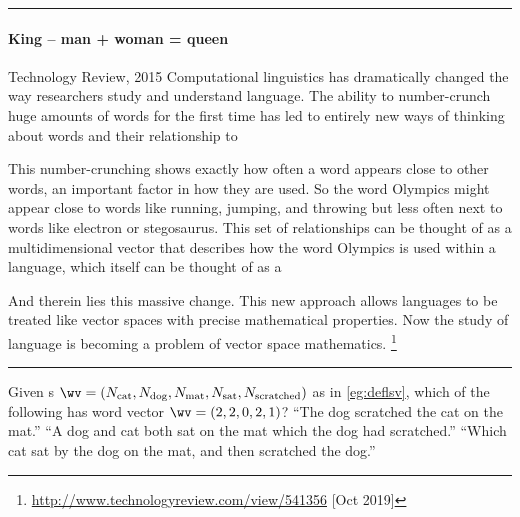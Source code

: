 \begin{table}
\hrule
\begin{minipage}{\linewidth}
\paragraph{King -- man + woman = queen}
\begin{quoted}{Technology Review, 2015}
Computational linguistics has dramatically changed the way researchers study and understand language. 
The ability to number-crunch huge amounts of words for the first time has led to entirely new ways of thinking about words and their relationship to 

This number-crunching shows exactly how often a word appears close to other words, an important factor in how they are used. 
So the word Olympics might appear close to words like running, jumping, and throwing but less often next to words like electron or stegosaurus.  
This set of relationships can be thought of as a multidimensional vector that describes how the word Olympics is used within a language, which itself can be thought of as a 

And therein lies this massive change. 
This new approach allows languages to be treated like vector spaces with precise mathematical properties. 
Now the study of language is becoming a problem of vector space mathematics.
\footnote{\url{http://www.technologyreview.com/view/541356} [Oct 2019]}
\end{quoted}
\end{minipage}
\hrule
\end{table}




\begin{activity}
Given s \(\sloppy\wv=(N_{\text{cat}}, N_{\text{dog}}, N_{\text{mat}}, N_{\text{sat}}, N_{\text{scratched}})\) as in \cref{eg:deflsv},
which of the following has word vector \(\wv=(2,2,0,2,1)\)?
{``The dog scratched the cat on the mat.''}
{``A dog and cat both sat on the mat which the dog had scratched.''}
{``Which cat sat by the dog on the mat, and then scratched the dog.''}
\end{activity}







